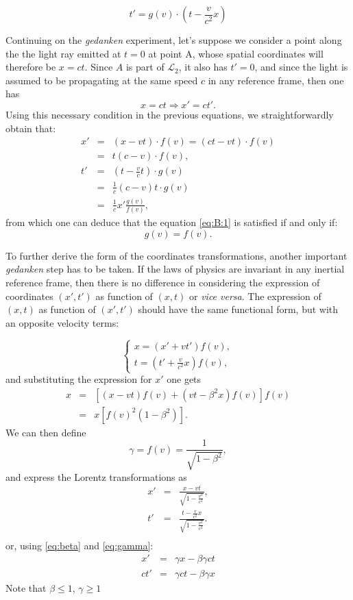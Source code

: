 \[t' = g(v)\cdot\left(t-\frac{v}{c^2}x\right)\]

Continuing on the {\it gedanken} experiment, let's suppose we consider a point along the the light ray emitted at $t=0$ at point A, whose spatial coordinates will therefore be $x=ct$. Since $A$ is part of $\mathcal{L}_2$, it also has $t'=0$, and since the light is assumed to be propagating at the same speed $c$ in any reference frame, then one has 
\begin{equation}
  \label{eq:B:1}
     x = ct \Rightarrow
    x'=ct'.
 \end{equation}
Using this necessary condition in the previous equations, we straightforwardly obtain that:
\begin{eqnarray*}
  x' &=& (x-vt)\cdot f(v) = (ct-vt)\cdot f(v)\\
  &=& t(c-v)\cdot f(v),\\
  t' &=& \left(t-\frac{v}{c}t\right)\cdot g(v)\\
  &=& \frac{1}{c} (c-v) t \cdot g(v)\\
  &=& \frac{1}{c} x' \frac{g(v)}{f(v)},
\end{eqnarray*}
from which one can deduce that the equation \eqref{eq:B:1} is satisfied if and only if:
\[g(v) = f(v).\]

To further derive the form of the coordinates transformations, another important {\it gedanken} step has to be taken. If the laws of physics are invariant in any inertial reference frame, then there is no difference in considering the expression of coordinates $(x',t')$ as function of $(x,t)$ or \emph{vice versa}. The expression of $(x,t)$ as function of $(x',t')$ should have the same functional form, but with an opposite velocity terms:

\begin{equation}
  \begin{cases}
    x = (x'+vt')f(v),\\
    t = \left(t' + \frac{v}{c^2}x\right)f(v),
  \end{cases}
\end{equation}
and substituting the expression for $x'$ one gets
\begin{eqnarray*}
  x &=& \left[ \left( x-vt\right)f(v)+\left(vt-\beta^2x\right)f(v)\right]f(v)\\
  &=& x\left[f(v)^2\left(1-\beta^2\right)\right].
\end{eqnarray*}
We can then define
\begin{equation}
  \label{eq:gamma}
  \gamma = f(v) = \frac{1}{\sqrt{1-\beta^2}},
\end{equation}
and express the Lorentz transformations as
\begin{eqnarray}
  x' &=& \frac{x-vt}{\sqrt{1-\frac{v^2}{c^2}}},\\
  t' &=& \frac{t-\frac{v}{c^2}x}{\sqrt{1-\frac{v^2}{c^2}}}.\\
\end{eqnarray}
or, using \eqref{eq:beta} and \eqref{eq:gamma}:
\begin{eqnarray}
  x' &=& \gamma x -\beta\gamma c t \\
  ct' &=& \gamma ct -\beta\gamma x
\end{eqnarray}
Note that $\beta\leq1$, $\gamma\geq1$

